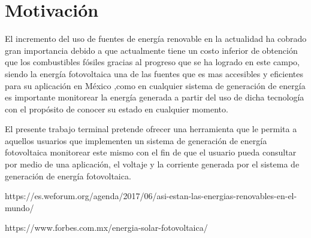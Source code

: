 \section{Motivación}
El incremento del uso de fuentes de energía renovable en la actualidad ha cobrado gran importancia debido a que actualmente tiene un costo inferior de obtención que los combustibles fósiles gracias al progreso que se ha logrado en este campo, siendo la energía fotovoltaica una de las fuentes que es mas accesibles y eficientes para su aplicación en México \citep{Not1},como en cualquier sistema de generación de energía es importante monitorear la energía generada a partir del uso de dicha tecnología con el propósito de conocer su estado en cualquier momento.
 
El presente trabajo terminal pretende ofrecer una herramienta que le permita a aquellos usuarios que implementen un sistema de generación de energía fotovoltaica monitorear este mismo con el fin de que el usuario pueda consultar por medio de una aplicación, el voltaje y la corriente generada por el sistema de generación de energía fotovoltaica.

 \citep{Not2}
https://es.weforum.org/agenda/2017/06/asi-estan-las-energias-renovables-en-el-mundo/

https://www.forbes.com.mx/energia-solar-fotovoltaica/